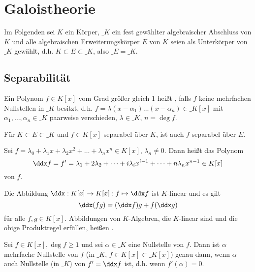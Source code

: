 \chapter{Galoistheorie}


Im Folgenden sei $K$ ein Körper, $\_K$ ein fest gewählter algebraischer Abschluss von $K$ und alle algebraischen Erweiterungskörper $E$ von $K$ seien als Unterkörper von $\_K$ gewählt, d.h. $K \subset E \subset \_K$, also $\_E = \_K$.


\section{Separabilität}


\begin{df} \label{19.1-1}
	Ein Polynom $f \in K[x]$ vom Grad größer gleich 1 heißt , falls $f$ keine mehrfachen Nullstellen in $\_K$ besitzt, d.h. $f = \lambda (x - \alpha_1) \dotsc (x - \alpha_n) \in \_K[x]$ mit $\alpha_1, \dotsc, \alpha_n \in \_K$ paarweise verschieden, $\lambda \in \_K$, $n = \deg f$.
	\begin{note}
		Für $K \subset E \subset \_K$ und $f \in K[x]$ separabel über $K$, ist auch $f$ separabel über $E$.
	\end{note}
\end{df}

\begin{df} \label{19.1-2}
	Sei $f = \lambda_0 + \lambda_1 x + \lambda_2 x^2 + \dotsc + \lambda_n x^n \in K[x]$, $\lambda_n \neq 0$.
	Dann heißt das Polynom
	\[
		\ddx f = f' = \lambda_1 + 2 \lambda_2 + \dotsb + i \lambda_i x^{i-1} + \dotsb + n \lambda_n x^{n-1}
		\in K[x]
	\]
	 von $f$.
\end{df}

\begin{lem}[Produktregel] \label{19.1-3}
	Die Abbildung $\ddx: K[x] \to K[x] : f \mapsto \ddx f$ ist $K$-linear und es gilt
	\[
		\ddx (fg) = (\ddx f) g + f (\ddx g)
	\]
	für alle $f, g \in K[x]$.
	Abbildungen von $K$-Algebren, die $K$-linear sind und die obige Produktregel erfüllen, heißen .
\end{lem}

\begin{lem} \label{19.1-4}
	Sei $f \in K[x], \deg f \ge 1$ und sei $\alpha \in \_K$ eine Nullstelle von $f$.
	Dann ist $\alpha$ mehrfache Nullstelle von $f$ (in $\_K$, $f \in K[x] \subset \_K[x]$) genau dann, wenn $\alpha$ auch Nullstelle (in $\_K$) von $f' = \ddx f$ ist, d.h. wenn $f'(\alpha) = 0$.
\end{lem}

